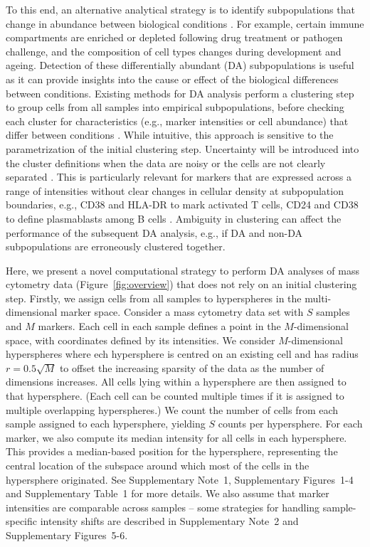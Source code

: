 \documentclass{article}
\newcommand{\suppsechypersphere}{1}
\newcommand{\suppsecnorm}{2}
\newcommand{\suppfigrad}{1-4}
\newcommand{\suppfigintnorm}{5-6}
\newcommand{\supptabparam}{1}
\begin{document}
To this end, an alternative analytical strategy is to identify subpopulations that change in abundance between biological conditions \cite{gaudilliere2014delayed,gaudilliere2015implementing}.
For example, certain immune compartments are enriched or depleted following drug treatment or pathogen challenge, and the composition of cell types changes during development and ageing.
Detection of these differentially abundant (DA) subpopulations is useful as it can provide insights into the cause or effect of the biological differences between conditions.
Existing methods for DA analysis perform a clustering step to group cells from all samples into empirical subpopulations, before checking each cluster for characteristics (e.g., marker intensities or cell abundance) that differ between conditions \cite{anchang2016visualization,bruggner2014automated}.
While intuitive, this approach is sensitive to the parametrization of the initial clustering step.
Uncertainty will be introduced into the cluster definitions when the data are noisy or the cells are not clearly separated \cite{ronan2016avoiding}.
This is particularly relevant for markers that are expressed across a range of intensities without clear changes in cellular density at subpopulation boundaries, e.g., CD38 and HLA-DR to mark activated T cells, CD24 and CD38 to define plasmablasts among B cells \cite{finak2016standardizing}.
Ambiguity in clustering can affect the performance of the subsequent DA analysis, e.g., if DA and non-DA subpopulations are erroneously clustered together. 

Here, we present a novel computational strategy to perform DA analyses of mass cytometry data (Figure~\ref{fig:overview}) that does not rely on an initial clustering step.
Firstly, we assign cells from all samples to hyperspheres in the multi-dimensional marker space.
Consider a mass cytometry data set with $S$ samples and $M$ markers.
Each cell in each sample defines a point in the $M$-dimensional space, with coordinates defined by its intensities.
We consider $M$-dimensional hyperspheres where ech hypersphere is centred on an existing cell and has radius $r=0.5\sqrt{M}$ to offset the increasing sparsity of the data as the number of dimensions increases.
All cells lying within a hypersphere are then assigned to that hypersphere.
(Each cell can be counted multiple times if it is assigned to multiple overlapping hyperspheres.)
We count the number of cells from each sample assigned to each hypersphere, yielding $S$ counts per hypersphere.
For each marker, we also compute its median intensity for all cells in each hypersphere.
This provides a median-based position for the hypersphere, representing the central location of the subspace around which most of the cells in the hypersphere originated.
See Supplementary Note~\suppsechypersphere{}, Supplementary Figures~\suppfigrad{} and Supplementary Table~\supptabparam{} for more details.
We also assume that marker intensities are comparable across samples -- some strategies for handling sample-specific intensity shifts are described in Supplementary Note~\suppsecnorm{} and Supplementary Figures~\suppfigintnorm{}.
\end{document}
